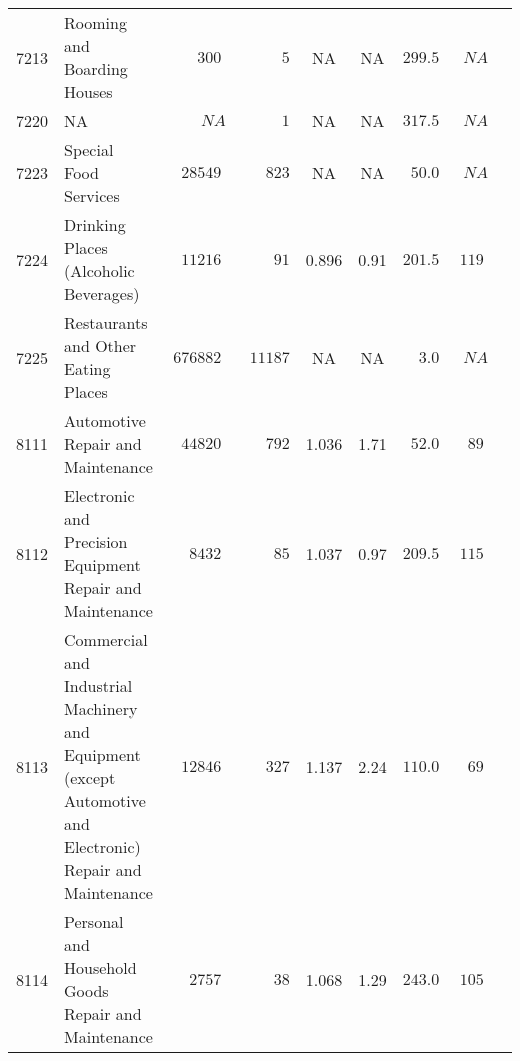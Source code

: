 \documentclass[9pt, oneside]{article}   	%
\begin{document}
\begin{longtable}{lp{3 in}ccccccc}
7213  & Rooming and Boarding Houses & $\phantom{000}300$ & $\phantom{00000}5$ &    NA &    NA & $299.5$ & $\phantom{0}NA$ \\
7220  & NA & $\phantom{0000}NA$ & $\phantom{00000}1$ &    NA &    NA & $317.5$ & $\phantom{0}NA$ \\
7223  & Special Food Services & $\phantom{0}28549$ & $\phantom{000}823$ &    NA &    NA & $\phantom{0}50.0$ & $\phantom{0}NA$ \\
7224  & Drinking Places (Alcoholic Beverages) & $\phantom{0}11216$ & $\phantom{0000}91$ & 0.896 &  0.91 & $201.5$ & $119$ \\
7225  & Restaurants and Other Eating Places & $676882$ & $\phantom{0}11187$ &    NA &    NA & $\phantom{00}3.0$ & $\phantom{0}NA$ \\
8111  & Automotive Repair and Maintenance & $\phantom{0}44820$ & $\phantom{000}792$ & 1.036 &  1.71 & $\phantom{0}52.0$ & $\phantom{0}89$ \\
8112  & Electronic and Precision Equipment Repair and Maintenance & $\phantom{00}8432$ & $\phantom{0000}85$ & 1.037 &  0.97 & $209.5$ & $115$ \\
8113  & Commercial and Industrial Machinery and Equipment (except Automotive and Electronic) Repair and Maintenance & $\phantom{0}12846$ & $\phantom{000}327$ & 1.137 &  2.24 & $110.0$ & $\phantom{0}69$ \\
8114  & Personal and Household Goods Repair and Maintenance & $\phantom{00}2757$ & $\phantom{0000}38$ & 1.068 &  1.29 & $243.0$ & $105$ \\


\end{longtable}
\end{document}
